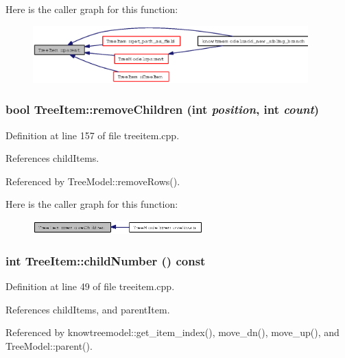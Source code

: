 Here is the caller graph for this function:\begin{figure}[H]
\begin{center}
\leavevmode
\includegraphics[width=301pt]{classTreeItem_392ec493dfab91ee474d7ff83e2c0211_icgraph}
\end{center}
\end{figure}
\subsubsection{\setlength{\rightskip}{0pt plus 5cm}bool Tree\-Item::remove\-Children (int {\em position}, int {\em count})}\label{classTreeItem_a9861c44a34b210bde61527b9b5018f3}




Definition at line 157 of file treeitem.cpp.

References child\-Items.

Referenced by Tree\-Model::remove\-Rows().

Here is the caller graph for this function:\begin{figure}[H]
\begin{center}
\leavevmode
\includegraphics[width=186pt]{classTreeItem_a9861c44a34b210bde61527b9b5018f3_icgraph}
\end{center}
\end{figure}
\subsubsection{\setlength{\rightskip}{0pt plus 5cm}int Tree\-Item::child\-Number () const}\label{classTreeItem_87e01b18fd3b575ef1338545380228f5}




Definition at line 49 of file treeitem.cpp.

References child\-Items, and parent\-Item.

Referenced by knowtreemodel::get\_\-item\_\-index(), move\_\-dn(), move\_\-up(), and Tree\-Model::parent().

